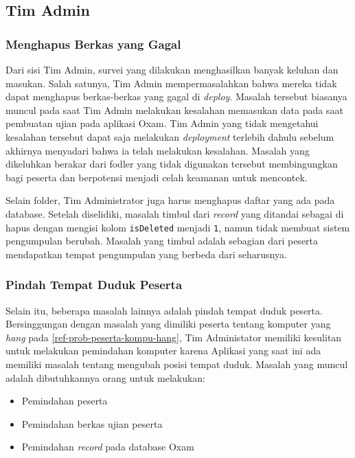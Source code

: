 \subsection{Tim Admin}
    \subsubsection{Menghapus Berkas yang
    Gagal}\label{ref-prob-admin-berkas-gagal} 
    Dari sisi Tim Admin, survei yang
    dilakukan menghasilkan banyak keluhan dan masukan. Salah satunya, Tim Admin
    mempermasalahkan bahwa mereka tidak dapat menghapus berkas-berkas yang gagal
    di \textit{deploy}. Masalah tersebut biasanya muncul pada saat Tim Admin
    melakukan kesalahan memasukan data pada saat pembuatan ujian pada aplikasi
    Oxam. Tim Admin yang tidak mengetahui kesalahan tersebut dapat saja
    melakukan \textit{deployment} terlebih dahulu sebelum akhirnya menyadari
    bahwa ia telah melakukan kesalahan. Masalah yang dikeluhkan berakar dari
    fodler yang tidak digunakan tersebut membingungkan bagi peserta dan
    berpotensi menjadi celah keamanan untuk mencontek.

    Selain folder, Tim Administrator juga harus menghapus daftar yang ada pada
    database. Setelah diselidiki, masalah timbul dari \textit{record} yang
    ditandai sebagai di hapus dengan mengisi kolom \texttt{isDeleted} menjadi
    \texttt{1}, namun tidak membuat sistem pengumpulan berubah. Masalah yang
    timbul adalah sebagian dari peserta mendapatkan tempat pengumpulan yang
    berbeda dari seharusnya.

    \subsubsection{Pindah Tempat Duduk Peserta}\label{ref-prob-admin-pindah}
    Selain itu, beberapa masalah lainnya adalah pindah tempat duduk peserta.
    Bersinggungan dengan masalah yang dimiliki peserta tentang komputer yang
    \textit{hang} pada \ref{ref-prob-peserta-kompu-hang}, Tim Administator
    memiliki kesulitan untuk melakukan pemindahan komputer karena Aplikasi yang
    saat ini ada memiliki masalah tentang mengubah posisi tempat duduk. Masalah
    yang muncul adalah dibutuhkannya orang untuk melakukan:
    \begin{itemize}
        \item Pemindahan peserta
        \item Pemindahan berkas ujian peserta
        \item Pemindahan \textit{record} pada database Oxam
    \end{itemize}

